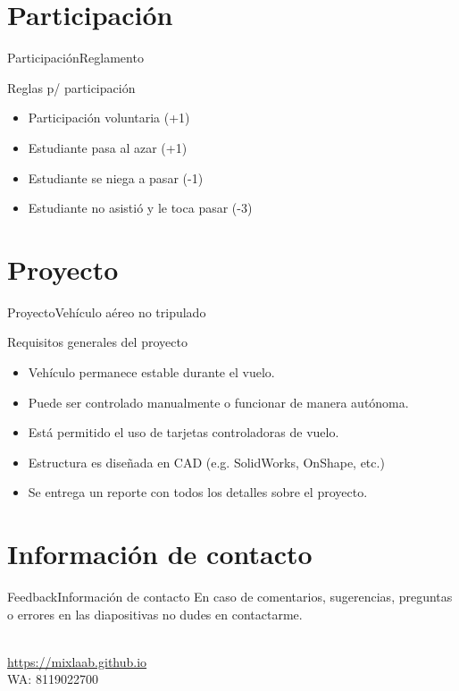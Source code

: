 \documentclass[10pt]{beamer}
\newcommand{\chref}[2]{%
  \href{#1}{{\usebeamercolor[bg]{Aalborg}#2}}%
}
\begin{document}
\section{Participación}
\begin{frame}{Participación}{Reglamento}
\begin{block}{Reglas p/ participación}
    \begin{itemize}
        \item Participación voluntaria (+1)
        \item Estudiante pasa al azar (+1)
        \item Estudiante se niega a pasar (-1)
        \item Estudiante no asistió y le toca pasar (-3)
    \end{itemize}
\end{block}

\end{frame}

\section{Proyecto}
\begin{frame}{Proyecto}{Vehículo aéreo no tripulado}
\begin{block}{Requisitos generales del proyecto}
    \begin{itemize}
        \item Vehículo permanece estable durante el vuelo.
        \item Puede ser controlado manualmente o funcionar de manera autónoma.
        \item Está permitido el uso de tarjetas controladoras de vuelo.
        \item Estructura es diseñada en CAD (e.g. SolidWorks, OnShape, etc.)
        \item Se entrega un reporte con todos los detalles sobre el proyecto.
    \end{itemize}
\end{block}

\end{frame}

\section{Información de contacto}
\begin{frame}{Feedback}{Información de contacto}
En caso de comentarios, sugerencias, preguntas o errores en las diapositivas no dudes en contactarme.
  \begin{center}
    \insertauthor\\
    \chref{https://mixlaab.github.io}{https://mixlaab.github.io}\\
    WA: 8119022700\\
  \end{center}
\end{frame}

{\aauwavesbg%
\begin{frame}%
\end{frame}}
\end{document}
